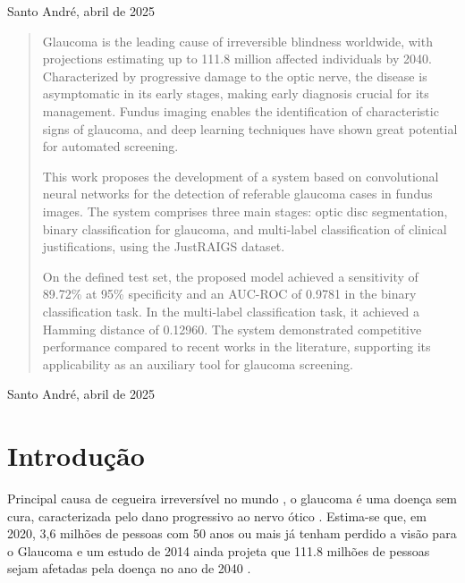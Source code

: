 \documentclass[12pt]{article}
\begin{document}
\begin{center}
Santo André, abril de 2025
\end{center}

\newpage


\begin{center}
\end{center}

\begin{quote}

Glaucoma is the leading cause of irreversible blindness worldwide, with projections estimating up to 111.8 million affected individuals by 2040. Characterized by progressive damage to the optic nerve, the disease is asymptomatic in its early stages, making early diagnosis crucial for its management. Fundus imaging enables the identification of characteristic signs of glaucoma, and deep learning techniques have shown great potential for automated screening.

This work proposes the development of a system based on convolutional neural networks for the detection of referable glaucoma cases in fundus images. The system comprises three main stages: optic disc segmentation, binary classification for glaucoma, and multi-label classification of clinical justifications, using the JustRAIGS dataset.

On the defined test set, the proposed model achieved a sensitivity of 89.72\% at 95\% specificity and an AUC-ROC of 0.9781 in the binary classification task. In the multi-label classification task, it achieved a Hamming distance of 0.12960. The system demonstrated competitive performance compared to recent works in the literature, supporting its applicability as an auxiliary tool for glaucoma screening.

\end{quote}

\begin{center}
Santo André, abril de 2025
\end{center}

\newpage

\tableofcontents

\newpage


\section{Introdução}
\label{sec:introducao}

Principal causa de cegueira irreversível no mundo \cite{steinmetz_causes_2021}, o glaucoma é uma doença sem cura, caracterizada pelo dano progressivo ao nervo ótico \cite{who_2019}. Estima-se que, em 2020, 3,6 milhões de pessoas com 50 anos ou mais já tenham perdido a visão para o Glaucoma \cite{steinmetz_causes_2021} e um estudo de 2014 ainda projeta que 111.8 milhões de pessoas sejam afetadas pela doença no ano de 2040 \cite{tham_global_2014}.
\end{document}
